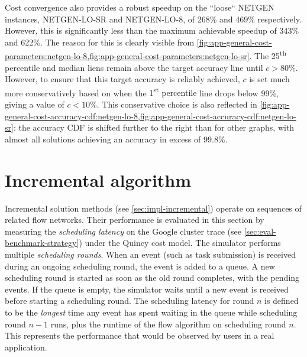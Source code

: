 Cost convergence also provides a robust speedup on the ``loose`` NETGEN instances, NETGEN-LO-SR and NETGEN-LO-8, of 268\% and 469\% respectively. However, this is significantly less than the maximum achievable speedup of 343\% and 622\%. The reason for this is clearly visible from \cref{fig:app-general-cost-parameters:netgen-lo-8,fig:app-general-cost-parameters:netgen-lo-sr}. The 25\textsuperscript{th} percentile and {\color{matplotlib_cyan} median} liens remain above the target accuracy line until $c > 80\%$. However, to ensure that this target accuracy is reliably achieved, $c$ is set much more conservatively based on when the {\color{matplotlib_blue} 1\textsuperscript{st} percentile} line drops below 99\%, giving a value of $c < 10\%$. This conservative choice is also reflected in \cref{fig:app-general-cost-accuracy-cdf:netgen-lo-8,fig:app-general-cost-accuracy-cdf:netgen-lo-sr}: the accuracy CDF is shifted further to the right than for other graphs, with almost all solutions achieving an accuracy in excess of 99.8\%.

\section{Incremental algorithm} \label{sec:eval-incremental}

Incremental solution methods (see \cref{sec:impl-incremental}) operate on sequences of related flow networks. Their performance is evaluated in this section by measuring the \emph{scheduling latency} on the Google cluster trace (see \cref{sec:eval-benchmark-strategy}) under the Quincy cost model. The simulator performs multiple \emph{scheduling rounds}. When an event (such as task submission) is received during an ongoing scheduling round, the event is added to a queue. A new scheduling round is started as soon as the old round completes, with the pending events. If the queue is empty, the simulator waits until a new event is received before starting a scheduling round. The scheduling latency for round $n$ is defined to be the \emph{longest} time any event has spent waiting in the queue while scheduling round $n-1$ runs, plus the runtime of the flow algorithm on scheduling round $n$. This represents the performance that would be observed by users in a real application.



